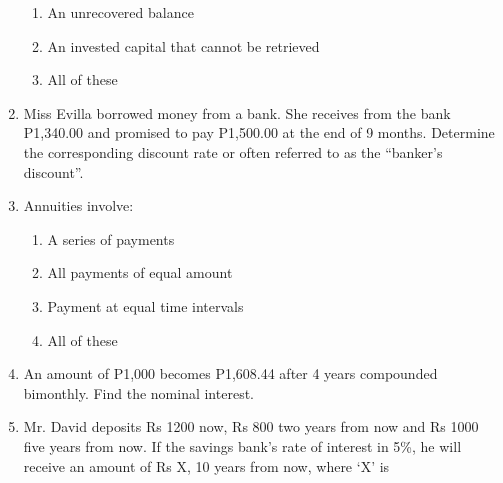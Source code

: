 \documentclass[11pt,a4paper]{article}
\begin{document}
\begin{enumerate}
\begin{enumerate}[label=\Alph*.]
\item{An unrecovered balance}
\item{An invested capital that cannot be retrieved}
\item{All of these}
\end{enumerate}
\item{Miss Evilla borrowed money from a bank. She receives from the bank P1,340.00 and promised to pay P1,500.00 at the end of 9 months. Determine the corresponding discount rate or often referred to as the ``banker's discount''.
}
\\
\item{Annuities involve:}
\begin{enumerate}[label=\Alph*.]
\item{A series of payments}
\item{All payments of equal amount}
\item{Payment at equal time intervals}
\item{All of these}
\end{enumerate}
\item{An amount of P1,000 becomes P1,608.44 after 4 years compounded bimonthly. Find the nominal interest.}
\\
\item{Mr. David deposits Rs 1200 now, Rs 800 two years from now and Rs 1000 five years from now. If the savings bank's rate of interest in 5\%, he will receive an amount of Rs X, 10 years from now, where `X' is
}
\\
\end{enumerate}
\end{document}
